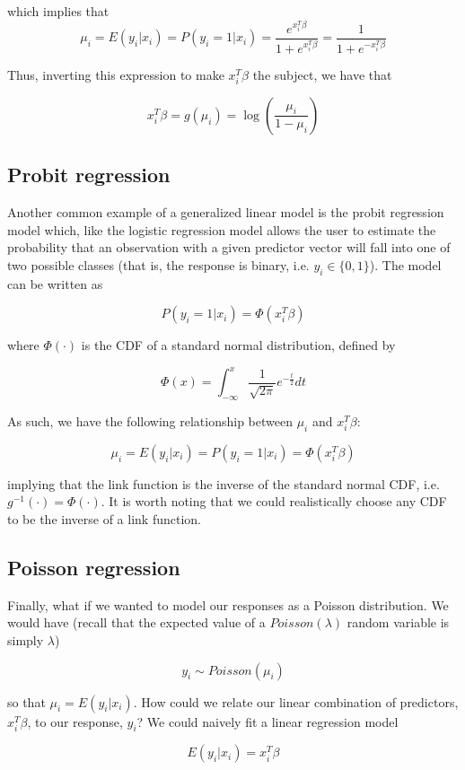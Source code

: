 which implies that 
$$\mu_i = E(y_i | x_i) = P(y_i = 1 |x_i) = \frac{e^{x_i^T\beta}}{1 + e^{x_i^T\beta}} = \frac{1}{1 + e^{-x_i^T\beta}}$$ 

Thus, inverting this expression to make $x_i^T\beta$ the subject, we have that

$$x_i^T\beta = g(\mu_i) = \log \left( \frac{\mu_i}{1 - \mu_i} \right)$$ 

\subsection*{Probit regression}

Another common example of a generalized linear model is the probit regression model which, like the logistic regression model allows the user to estimate the probability that an observation with a given predictor vector will fall into one of two possible classes (that is, the response is binary, i.e. $y_i \in \{ 0, 1\}$). The model can be written as

$$P(y_i = 1 | x_i) = \Phi\left(x_i^T\beta\right)$$

where $\Phi(\cdot)$ is the CDF of a standard normal distribution, defined by

$$\Phi(x) = \int^x_{-\infty} \frac{1}{\sqrt{2\pi}} e^{-\frac{t}{2}} dt$$

As such, we have the following relationship between $\mu_i$ and $x_i^T\beta$:

$$\mu_i = E(y_i | x_i) = P(y_i = 1 | x_i) = \Phi\left(x_i^T \beta\right)$$

implying that the link function is the inverse of the standard normal CDF, i.e. $g^{-1}(\cdot) = \Phi(\cdot)$. It is worth noting that we could realistically choose any CDF to be the inverse of a link function. 

\subsection*{Poisson regression}

Finally, what if we wanted to model our responses as a Poisson distribution. We would have (recall that the expected value of a $Poisson(\lambda)$ random variable is simply $\lambda$)

$$y_i \sim Poisson(\mu_i)$$

so that $\mu_i = E(y_i | x_i)$. How could we relate our linear combination of predictors, $x_i^T\beta$, to our response, $y_i$? We could naively fit a linear regression model

$$E(y_i | x_i) = x_i^T \beta $$

